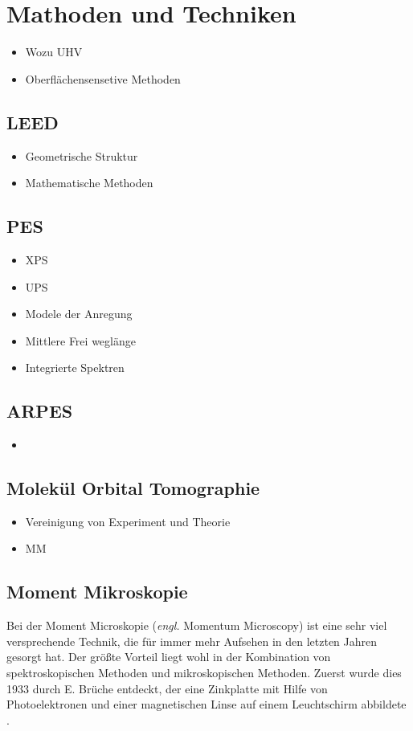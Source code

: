 \chapter{Mathoden und Techniken}
    \begin{itemize}
        \item Wozu UHV
        \item Oberflächensensetive Methoden
    \end{itemize}
\section{LEED}
    \begin{itemize}
        \item Geometrische Struktur
        \item Mathematische Methoden
    \end{itemize}
\section{PES}
    \begin{itemize}
        \item XPS
        \item UPS
        \item Modele der Anregung
        \item Mittlere Frei weglänge
        \item Integrierte Spektren
    \end{itemize}

\section{ARPES}
    \begin{itemize}
        \item 
    \end{itemize}

\section{Molekül Orbital Tomographie}
    \begin{itemize}
        \item Vereinigung von Experiment und Theorie
        \item MM
    \end{itemize}

    \section{Moment Mikroskopie} \label{sec:MM}
        Bei der Moment Microskopie (\textit{engl.} Momentum Microscopy) ist eine sehr viel versprechende Technik, die für immer mehr Aufsehen in den letzten Jahren gesorgt hat.
        Der größte Vorteil liegt wohl in der Kombination von spektroskopischen Methoden und mikroskopischen Methoden.
        Zuerst wurde dies 1933 durch E. Brüche entdeckt, der eine Zinkplatte mit Hilfe von Photoelektronen und einer magnetischen Linse auf einem Leuchtschirm abbildete \cite{bruche_elektronenmikroskopische_1933}.

